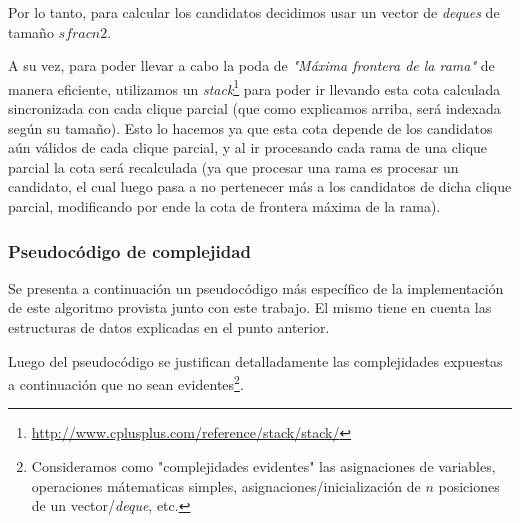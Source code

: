 \par Por lo tanto, para calcular los candidatos decidimos usar un vector de
    \emph{deques} de tama\~no $sfrac{n}{2}$.

\par A su vez, para poder llevar a cabo la poda de \emph{"M\'axima frontera de
    la rama"} de manera eficiente, utilizamos un \emph{stack}\footnote{%
    \url{http://www.cplusplus.com/reference/stack/stack/}} para poder ir
    llevando esta cota calculada sincronizada con cada clique parcial (que
    como explicamos arriba, ser\'a indexada seg\'un su tama\~no). Esto lo
    hacemos ya que esta cota depende de los candidatos a\'un v\'alidos
    de cada clique parcial, y al ir procesando cada rama de una clique
    parcial la cota ser\'a recalculada (ya que procesar una rama es
    procesar un candidato, el cual luego pasa a no pertenecer m\'as a
    los candidatos de dicha clique parcial, modificando por ende la
    cota de frontera m\'axima de la rama).

\subsubsection{Pseudoc\'odigo de complejidad}
\par Se presenta a continuaci\'on un pseudoc\'odigo m\'as espec\'ifico de la implementaci\'on
    de este algoritmo provista junto con este trabajo. El mismo tiene en cuenta
    las estructuras de datos explicadas en el punto anterior.

\par Luego del pseudoc\'odigo se justifican detalladamente las complejidades
    expuestas a continuaci\'on que no sean evidentes\footnote{Consideramos
    como "complejidades evidentes" las asignaciones de variables, operaciones
    m\'atematicas simples, asignaciones/inicializaci\'on de $n$ posiciones de
    un vector/\emph{deque}, etc.}.

